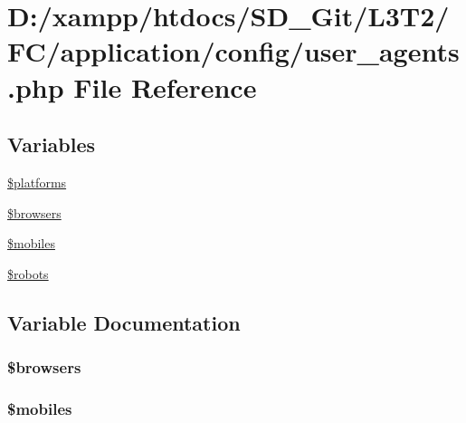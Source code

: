 \hypertarget{user__agents_8php}{}\section{D\+:/xampp/htdocs/\+S\+D\+\_\+\+Git/\+L3\+T2/\+F\+C/application/config/user\+\_\+agents.php File Reference}
\label{user__agents_8php}
\subsection*{Variables}
\begin{DoxyCompactItemize}
\item 
\hyperlink{user__agents_8php_a1c1a0a860242698ee6b3f4ef7d6eb343}{\$platforms}
\item 
\hyperlink{user__agents_8php_a81edf933083b5ac5b380385f59074a7d}{\$browsers}
\item 
\hyperlink{user__agents_8php_a6928dde5aa0be443766d5b2376de908a}{\$mobiles}
\item 
\hyperlink{user__agents_8php_a5752e2a66d1c03bc34666492746037ab}{\$robots}
\end{DoxyCompactItemize}


\subsection{Variable Documentation}
\hypertarget{user__agents_8php_a81edf933083b5ac5b380385f59074a7d}{}
\subsubsection[{\$browsers}]{\setlength{\rightskip}{0pt plus 5cm}\$browsers}\label{user__agents_8php_a81edf933083b5ac5b380385f59074a7d}
\hypertarget{user__agents_8php_a6928dde5aa0be443766d5b2376de908a}{}
\subsubsection[{\$mobiles}]{\setlength{\rightskip}{0pt plus 5cm}\$mobiles}\label{user__agents_8php_a6928dde5aa0be443766d5b2376de908a}
\hypertarget{user__agents_8php_a1c1a0a860242698ee6b3f4ef7d6eb343}{}
